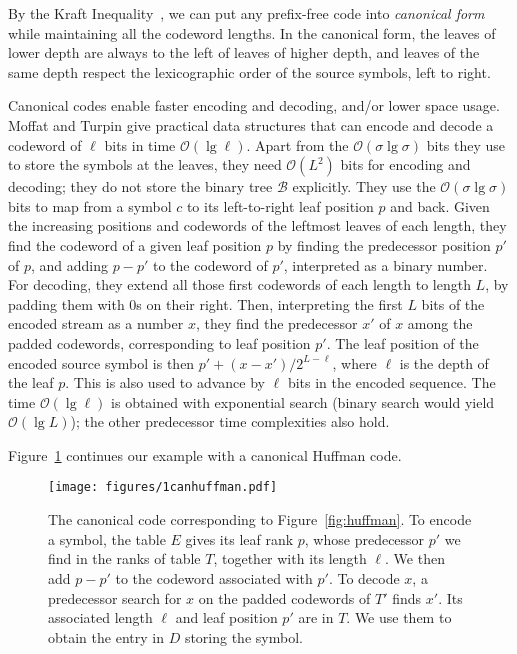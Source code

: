 \documentclass[preprint,12pt]{elsarticle}
\newcommand{\Oh}[1]{\ensuremath{\mathcal{O}\!\left({#1}\right)}}
\newcommand{\B}{\mathcal{B}}
\renewcommand{\log}{\lg}
\begin{document}
By the Kraft Inequality~\cite{Kra49}, we can put any prefix-free code into 
{\em canonical form} \cite{SK64} while maintaining all the codeword lengths.
In the canonical form, the leaves of lower depth are always to the left of 
leaves of higher depth, and leaves of the same depth respect the lexicographic 
order of the source symbols, left to right. 

Canonical codes enable faster encoding and decoding, and/or lower space usage.
Moffat and Turpin \cite{MT97} give practical data structures that can encode
and decode a codeword of $\ell$ bits in time $\Oh{\log\ell}$. Apart from the
$\Oh{\sigma\log\sigma}$ bits they use to store the symbols at the leaves, they 
need $\Oh{L^2}$ bits for encoding and decoding; they do not store the
binary tree $\B$ explicitly. They use the $\Oh{\sigma\log\sigma}$ bits
to map from a symbol $c$ to its left-to-right leaf position $p$ 
and back. Given the increasing positions and codewords of the leftmost leaves
of each length, they find the codeword of a given leaf position $p$ by finding 
the predecessor position $p'$ of $p$, and adding $p-p'$ to the codeword of
$p'$, interpreted as a binary number. For decoding, they extend all those 
first codewords of each length to length $L$, by padding them with $0$s on 
their right. Then, interpreting the first $L$ bits of the encoded stream
as a number $x$, they find the predecessor $x'$ of $x$ among the
padded codewords, corresponding to leaf position $p'$. The leaf position of the
encoded source symbol is then $p'+(x-x')/2^{L-\ell}$, where $\ell$ is the 
depth of the leaf $p$. This is also used to advance by $\ell$ bits in the 
encoded sequence. The time $\Oh{\log\ell}$ is obtained with exponential 
search (binary search would yield $\Oh{\log L}$); the other predecessor time complexities also hold.  

Figure~\ref{fig:canonical} continues our example with a canonical Huffman code.

\begin{figure}[t]
\begin{center}
\texttt{[image: figures/1canhuffman.pdf]}
\end{center}
\vspace*{-5mm}
\caption{The canonical code corresponding to Figure~\ref{fig:huffman}. To
encode a symbol, the table $E$ gives its leaf rank $p$, whose predecessor $p'$
we find in the ranks of table $T$, together with its length $\ell$. We then add
$p-p'$ to the codeword associated with $p'$. To decode $x$, a predecessor 
search for $x$ on the padded codewords of $T'$ finds $x'$. Its associated 
length $\ell$ and leaf position $p'$ are in $T$. We use them 
to obtain the entry in $D$ storing the symbol.}
\label{fig:canonical}
\end{figure}
\end{document}
